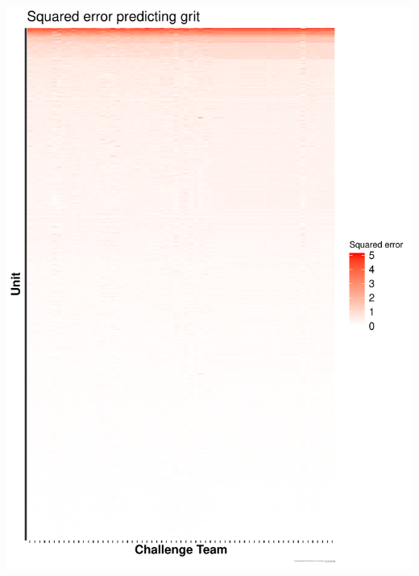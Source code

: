 \documentclass{beamer}
\begin{document}
\begin{frame}
\begin{center}
\includegraphics[width=0.30\textheight]{figures/grit_ysort_mse_unit_outcome_xsort_mse_account_outcome.pdf}

\end{center}
\end{frame}
\end{document}
